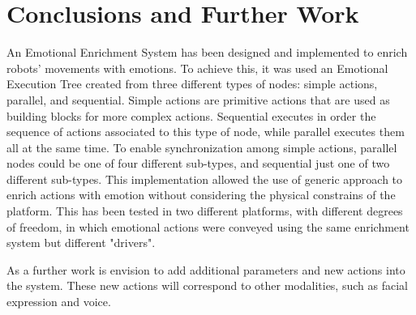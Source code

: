 \documentclass{sig-alternate-05-2015}
\begin{document}
\section{Conclusions and Further Work}

An Emotional Enrichment System has been designed and implemented to enrich robots' movements with emotions. To achieve this, it was used an Emotional Execution Tree created from three different types of nodes: simple actions, parallel, and sequential. Simple actions are primitive actions that are used as building blocks for more complex actions. Sequential executes in order the sequence of actions associated to this type of node, while parallel executes them all at the same time. To enable synchronization among simple actions, parallel nodes could be one of four different sub-types, and sequential just one of two different sub-types. This implementation allowed the use of generic approach to enrich actions with emotion without considering the physical constrains of the platform. This has been tested in two different platforms, with different degrees of freedom, in which emotional actions were conveyed using the same enrichment system but different "drivers". 

As a further work is envision to add additional parameters and new actions into the system. These new actions will correspond to other modalities, such as facial expression and voice.


\end{document}
